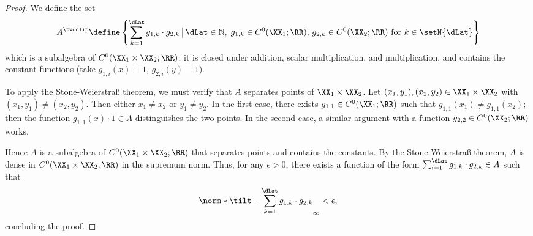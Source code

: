 \documentclass{article}
\begin{document}
\begin{proof}
 We define the set
 \begin{align*}
  A^\twoclip \define \left\{ \sum_{k=1}^\dLat g_{1,k} \cdot g_{2,k}
  \,\big\vert\, \dLat \in \mathbb{N}, \; g_{1,k} \in C^0(\XX_1;\RR),\, g_{2,k}
  \in C^0(\XX_2;\RR) \text{ for } k\in \setN{\dLat}
  \right\}
 \end{align*}
 which is a subalgebra of $C^0(\XX_1 \times \XX_2; \RR)$: it is closed under
 addition, scalar multiplication, and multiplication, and contains the
 constant functions (take $g_{1,i}(x) \equiv 1$, $g_{2,i}(y) \equiv 1$).

 To apply the Stone-Weierstraß theorem, we must verify that $A$ separates
 points of $ \XX_1 \times \XX_2 $. Let $ (x_1, y_1), (x_2, y_2) \in \XX_1
  \times \XX_2 $ with $ (x_1, y_1) \neq (x_2, y_2) $. Then either $ x_1 \neq
  x_2 $ or $ y_1 \neq y_2 $. In the first case, there exists $ g_{1,1} \in
  C^0(\XX_1;\RR) $ such that $g_{1,1}(x_1) \neq g_{1,1}(x_2) $; then the
 function $ g_{1,1}(x) \cdot 1 \in A $ distinguishes the two points. In the
 second case, a similar argument with a function $g_{2,2} \in
  C^0(\XX_2;\RR)$ works.

 Hence $A$ is a subalgebra of $ C^0(\XX_1 \times \XX_2;\RR) $ that separates
 points and contains the constants. By the Stone-Weierstraß theorem, $ A $
 is dense in $ C^0(\XX_1 \times \XX_2;\RR) $ in the supremum norm. Thus, for
 any $\epsilon > 0 $, there exists a function of the form $ \sum_{i=1}^\dLat
  g_{1,k} \cdot g_{2,k} \in A $ such that
 \begin{align*}
  \norm*{\tilt - \sum_{k=1}^\dLat g_{1,k}\cdot g_{2,k}}_\infty < \epsilon,
 \end{align*}
 concluding the proof.
\end{proof}
\end{document}
